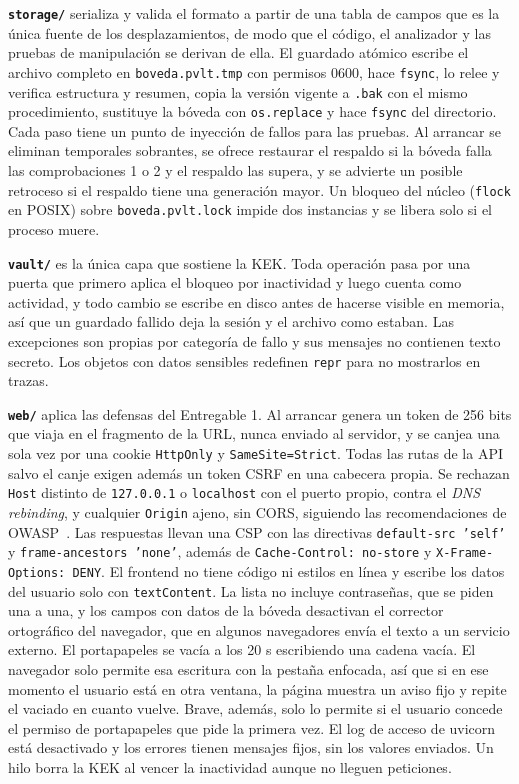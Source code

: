 \documentclass[11pt,letterpaper]{article}
\newcommand{\code}[1]{\texttt{#1}}
\begin{document}
\textbf{\code{storage/}} serializa y valida el formato a partir de una tabla de campos que es la única fuente de los desplazamientos, de modo que el código, el analizador y las pruebas de manipulación se derivan de ella. El guardado atómico escribe el archivo completo en \code{boveda.pvlt.tmp} con permisos 0600, hace \code{fsync}, lo relee y verifica estructura y resumen, copia la versión vigente a \code{.bak} con el mismo procedimiento, sustituye la bóveda con \code{os.replace} y hace \code{fsync} del directorio. Cada paso tiene un punto de inyección de fallos para las pruebas. Al arrancar se eliminan temporales sobrantes, se ofrece restaurar el respaldo si la bóveda falla las comprobaciones 1 o 2 y el respaldo las supera, y se advierte un posible retroceso si el respaldo tiene una generación mayor. Un bloqueo del núcleo (\code{flock} en POSIX) sobre \code{boveda.pvlt.lock} impide dos instancias y se libera solo si el proceso muere.

\textbf{\code{vault/}} es la única capa que sostiene la KEK. Toda operación pasa por una puerta que primero aplica el bloqueo por inactividad y luego cuenta como actividad, y todo cambio se escribe en disco antes de hacerse visible en memoria, así que un guardado fallido deja la sesión y el archivo como estaban. Las excepciones son propias por categoría de fallo y sus mensajes no contienen texto secreto. Los objetos con datos sensibles redefinen \code{repr} para no mostrarlos en trazas.

\textbf{\code{web/}} aplica las defensas del Entregable 1. Al arrancar genera un token de 256 bits que viaja en el fragmento de la URL, nunca enviado al servidor, y se canjea una sola vez por una cookie \code{HttpOnly} y \code{SameSite=Strict}. Todas las rutas de la API salvo el canje exigen además un token CSRF en una cabecera propia. Se rechazan \code{Host} distinto de \code{127.0.0.1} o \code{localhost} con el puerto propio, contra el \emph{DNS rebinding}, y cualquier \code{Origin} ajeno, sin CORS, siguiendo las recomendaciones de OWASP~\cite{owasp}. Las respuestas llevan una CSP con las directivas \code{default-src 'self'} y \code{frame-ancestors 'none'}, además de \code{Cache-Control: no-store} y \code{X-Frame-Options: DENY}. El frontend no tiene código ni estilos en línea y escribe los datos del usuario solo con \code{textContent}. La lista no incluye contraseñas, que se piden una a una, y los campos con datos de la bóveda desactivan el corrector ortográfico del navegador, que en algunos navegadores envía el texto a un servicio externo. El portapapeles se vacía a los 20 s escribiendo una cadena vacía. El navegador solo permite esa escritura con la pestaña enfocada, así que si en ese momento el usuario está en otra ventana, la página muestra un aviso fijo y repite el vaciado en cuanto vuelve. Brave, además, solo lo permite si el usuario concede el permiso de portapapeles que pide la primera vez. El log de acceso de uvicorn está desactivado y los errores tienen mensajes fijos, sin los valores enviados. Un hilo borra la KEK al vencer la inactividad aunque no lleguen peticiones.
\end{document}
